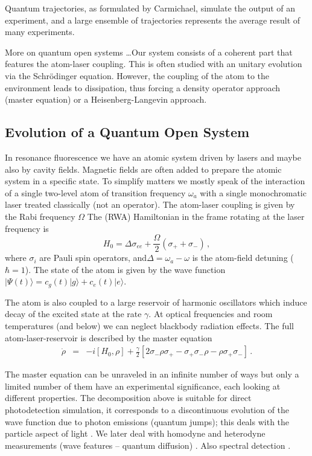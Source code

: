 \documentclass[twocolumn,aps,eqsecnum,showkeys,amsmath]{revtex4}
\providecommand{\ket}[1]{\lvert #1 \rangle}
\begin{document}
Quantum trajectories, as formulated by Carmichael, simulate the output of 
an experiment, and a large ensemble of trajectories represents the average 
result of many experiments. 

More on quantum open systems \ldots Our system consists of a coherent 
part that features the atom-laser coupling. This is often studied with an 
unitary evolution via the Schr\"odinger equation. However, the coupling of 
the atom to the environment leads to dissipation, thus forcing a density 
operator approach (master equation) or a Heisenberg-Langevin approach. 

\subsection{Evolution of a Quantum Open System} %
In resonance fluorescence we have an atomic system driven by lasers and 
maybe also by cavity fields. Magnetic fields are often added to prepare the 
atomic system in a specific state. To simplify matters we mostly speak of the 
interaction of a single two-level atom of transition frequency $\omega_a$ 
with a single monochromatic laser treated classically (not an operator). The 
atom-laser coupling is given by the Rabi frequency $\Omega$  The (RWA) 
Hamiltonian in the frame rotating at the laser frequency is 
%
\begin{equation}
H_0 = \Delta \sigma_{ee} +\frac{\Omega}{2}(\sigma_+  +\sigma_-)  \,,
\end{equation}
where $\sigma_i$ are Pauli spin operators, and$\Delta= \omega_a -\omega$ 
is the atom-field detuning ($\hbar=1$). The state of the atom is given by the 
wave function $\ket{\Psi (t)} = c_g(t) \ket{g} +c_e(t) \ket{e}$. 

The atom is also coupled to a large reservoir of harmonic oscillators which 
induce  decay of the excited state at the rate $\gamma$. At optical 
frequencies and room temperatures (and below)  we can neglect blackbody 
radiation effects. The full atom-laser-reservoir is described by the master 
equation 
%
\begin{eqnarray} 	\label{MasterEq}
\dot{\rho} &=& - i [H_0,\rho] +\frac{\gamma}{2} \left[ 2 \sigma_- \rho \sigma_+ 
	-\sigma_+ \sigma_- \rho - \rho  \sigma_+ \sigma_- \right]  	\,. 		
\end{eqnarray}

The master equation can be unraveled in an infinite number of ways but only 
a limited number of them have an experimental significance, each looking at 
different properties. The decomposition above is suitable for direct 
photodetection simulation, it corresponds to a discontinuous evolution of the 
wave function due to photon emissions (quantum jumps); this deals with the 
particle aspect of light  \cite{Carm93,DaCM92,DuZR92}. We later deal with 
homodyne and heterodyne measurements (wave features -- quantum 
diffusion) \cite{Carm93,Carm96,WiMi93a,WiMi93b,Perc98}. Also spectral 
detection \cite{TiCa92,Holl97}. 
\end{document}
